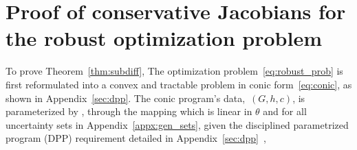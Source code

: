 \section{Proof of conservative Jacobians for the robust optimization problem}
\label{appx:subdiff}
To prove Theorem~\ref{thm:subdiff},
The optimization problem~\eqref{eq:robust_prob} is first reformulated into a convex and tractable problem in conic form~\eqref{eq:conic}, as shown in Appendix~\ref{sec:dpp}. 
The conic program's data,~$(G,h,c)$, is parameterized by , through the mapping 
which is linear in $\theta$ and  for all uncertainty sets in Appendix~\ref{appx:gen_sets}, given the disciplined parametrized program (DPP) requirement detailed in Appendix~\ref{sec:dpp}~\citep[Lemma 1]{cvxpylayers2019}, 



